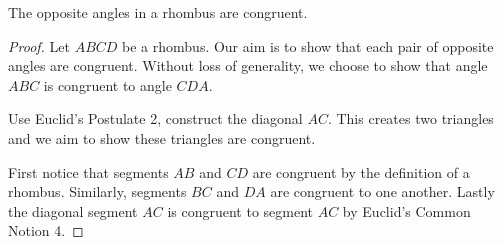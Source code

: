 \begin{classtheorem}
The opposite angles in a rhombus are congruent.
\end{classtheorem}
\begin{proof} %
Let $ABCD$ be a rhombus.  Our aim is to show that each pair of opposite angles are congruent.  Without loss of generality, we choose to show that angle $ABC$ is congruent to angle $CDA$.


Use Euclid's Postulate 2, construct the diagonal $AC$.  This creates two triangles and we aim to show these triangles are congruent.

First notice that segments $AB$ and $CD$ are congruent by the definition of a rhombus.  Similarly, segments $BC$ and $DA$ are congruent to one another.  Lastly the diagonal segment $AC$ is congruent to segment $AC$ by Euclid's Common Notion 4.


\end{proof}
